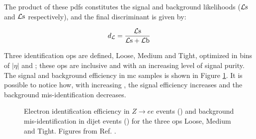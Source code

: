 The product of these \glspl{pdf} constitutes the 
signal and background likelihoods ($\mathcal{L}\rm s$ and $\mathcal{L}\rm s$ respectively), and the final discriminant is given by:

\begin{equation}
 d_\mathcal{L} = \frac{\mathcal{L}\rm s}{\mathcal{L}\rm s + \mathcal{L}\rm b}
\end{equation} 

Three identification \glspl{op} are defined, Loose, Medium and Tight, optimized in bins of $|\eta|$ and \et;
these \glspl{op} are inclusive and with an increasing level of signal purity.
The signal and background efficiency in \gls{mc} samples is shown in Figure \ref{fig:obj:ele_eff}. It is possible to notice how, with increasing
\et, the signal efficiency increases and the background mis-identification decreases.
 
\begin{figure}[h]
\begin{center}
\end{center}
 \caption{Electron identification efficiency in $Z\rightarrow e e$ events () and background mis-identification in dijet events () for the three \glspl{op} Loose, Medium and Tight. Figures from Ref. \cite{ATLAS:2016iqc}.
 }
  \label{fig:obj:ele_eff}
\end{figure}


